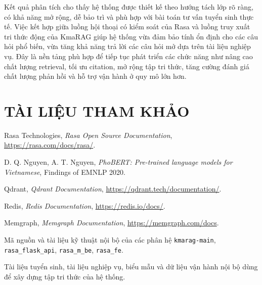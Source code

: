 \documentclass[12pt,a4paper]{report}
\renewcommand{\baselinestretch}{1.25}
\begin{document}
Kết quả phân tích cho thấy hệ thống được thiết kế theo hướng tách lớp rõ ràng, có khả năng mở rộng, dễ bảo trì và phù hợp với bài toán tư vấn tuyển sinh thực tế. Việc kết hợp giữa luồng hội thoại có kiểm soát của Rasa và luồng truy xuất tri thức động của KmaRAG giúp hệ thống vừa đảm bảo tính ổn định cho các câu hỏi phổ biến, vừa tăng khả năng trả lời các câu hỏi mở dựa trên tài liệu nghiệp vụ. Đây là nền tảng phù hợp để tiếp tục phát triển các chức năng như nâng cao chất lượng retrieval, tối ưu citation, mở rộng tập tri thức, tăng cường đánh giá chất lượng phản hồi và hỗ trợ vận hành ở quy mô lớn hơn.

\clearpage
\chapter*{TÀI LIỆU THAM KHẢO}
{}

\begingroup
\footnotesize
\renewcommand{\baselinestretch}{1.0}\selectfont
\setlength{\parskip}{0pt}
\setlength{\itemsep}{1pt}
\setlength{\parsep}{0pt}
\setlength{\topsep}{2pt}
\begin{enumerate}[leftmargin=1.2cm,label={[\arabic*]},itemsep=1pt,topsep=2pt]
\item Rasa Technologies, \textit{Rasa Open Source Documentation}, \url{https://rasa.com/docs/rasa/}.
\item D. Q. Nguyen, A. T. Nguyen, \textit{PhoBERT: Pre-trained language models for Vietnamese}, Findings of EMNLP 2020.
\item Qdrant, \textit{Qdrant Documentation}, \url{https://qdrant.tech/documentation/}.
\item Redis, \textit{Redis Documentation}, \url{https://redis.io/docs/}.
\item Memgraph, \textit{Memgraph Documentation}, \url{https://memgraph.com/docs}.
\item Mã nguồn và tài liệu kỹ thuật nội bộ của các phân hệ \texttt{kmarag-main}, \texttt{rasa\_flask\_api}, \texttt{rasa\_m\_be}, \texttt{rasa\_fe}.
\item Tài liệu tuyển sinh, tài liệu nghiệp vụ, biểu mẫu và dữ liệu vận hành nội bộ dùng để xây dựng tập tri thức của hệ thống.
\end{enumerate}
\endgroup
\end{document}
